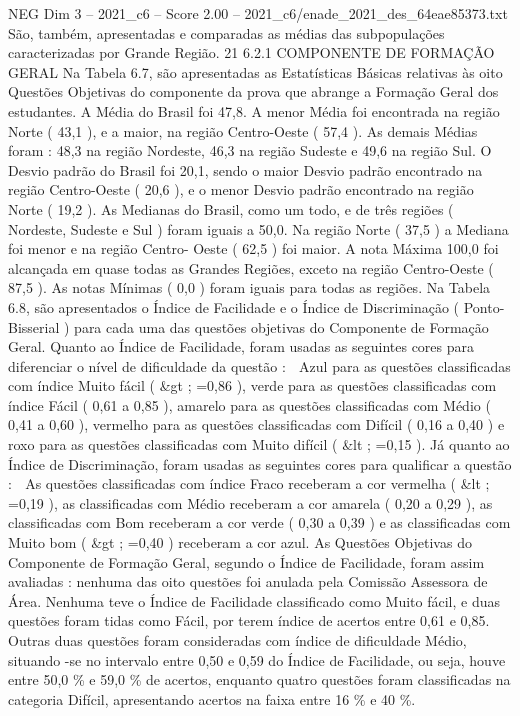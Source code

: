 \begin{textsample}{NEG Dim 3 – 2021\_c6 – Score 2.00 – 2021\_c6/enade\_2021\_des\_64eae85373.txt}
São, também, apresentadas e comparadas as médias das subpopulações caracterizadas por Grande Região. 21 6.2.1 COMPONENTE DE FORMAÇÃO GERAL Na Tabela 6.7, são apresentadas as Estatísticas Básicas relativas às oito Questões Objetivas do componente da prova que abrange a Formação Geral dos estudantes.
A Média do Brasil foi 47,8.
A menor Média foi encontrada na região Norte ( 43,1 ), e a maior, na região Centro-Oeste ( 57,4 ).
As demais Médias foram : 48,3 na região Nordeste, 46,3 na região Sudeste e 49,6 na região Sul.
O Desvio padrão do Brasil foi 20,1, sendo o maior Desvio padrão encontrado na região Centro-Oeste ( 20,6 ), e o menor Desvio padrão encontrado na região Norte ( 19,2 ).
As Medianas do Brasil, como um todo, e de três regiões ( Nordeste, Sudeste e Sul ) foram iguais a 50,0.
Na região Norte ( 37,5 ) a Mediana foi menor e na região Centro- Oeste ( 62,5 ) foi maior.
A nota Máxima 100,0 foi alcançada em quase todas as Grandes Regiões, exceto na região Centro-Oeste ( 87,5 ).
As notas Mínimas ( 0,0 ) foram iguais para todas as regiões.
Na Tabela 6.8, são apresentados o Índice de Facilidade e o Índice de Discriminação ( Ponto-Bisserial ) para cada uma das questões objetivas do Componente de Formação Geral.
Quanto ao Índice de Facilidade, foram usadas as seguintes cores para diferenciar o nível de dificuldade da questão :  Azul para as questões classificadas com índice Muito fácil ( \&gt ; =0,86 ), verde para as questões classificadas com índice Fácil ( 0,61 a 0,85 ), amarelo para as questões classificadas com Médio ( 0,41 a 0,60 ), vermelho para as questões classificadas com Difícil ( 0,16 a 0,40 ) e roxo para as questões classificadas com Muito difícil ( \&lt ; =0,15 ).
Já quanto ao Índice de Discriminação, foram usadas as seguintes cores para qualificar a questão :  As questões classificadas com índice Fraco receberam a cor vermelha ( \&lt ; =0,19 ), as classificadas com Médio receberam a cor amarela ( 0,20 a 0,29 ), as classificadas com Bom receberam a cor verde ( 0,30 a 0,39 ) e as classificadas com Muito bom ( \&gt ; =0,40 ) receberam a cor azul.
As Questões Objetivas do Componente de Formação Geral, segundo o Índice de Facilidade, foram assim avaliadas : nenhuma das oito questões foi anulada pela Comissão Assessora de Área.
Nenhuma teve o Índice de Facilidade classificado como Muito fácil, e duas questões foram tidas como Fácil, por terem índice de acertos entre 0,61 e 0,85.
Outras duas questões foram consideradas com índice de dificuldade Médio, situando -se no intervalo entre 0,50 e 0,59 do Índice de Facilidade, ou seja, houve entre 50,0 \% e 59,0 \% de acertos, enquanto quatro questões foram classificadas na categoria Difícil, apresentando acertos na faixa entre 16 \% e 40 \%.

\end{textsample}
